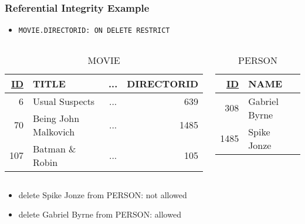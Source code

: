 \documentclass[dvipsnames]{beamer}
\theoremstyle{plain}
\begin{document}
\begin{frame}
  \frametitle{Referential Integrity Example}

  \begin{itemize}
    \item \lstinline!MOVIE.DIRECTORID: ON DELETE RESTRICT!
  \end{itemize}

  \begin{columns}
    \begin{tiny}
    \begin{table}
      \caption{MOVIE}
      \begin{tabular}{|r|l|c|r|}\hline
\underline{ID} & TITLE             & ... & DIRECTORID\\[2pt]\hline\hline
          6 & Usual Suspects       & ... &        639\\\hline
         70 & Being John Malkovich & ... &       1485\\\hline
        107 & Batman \& Robin      & ... &        105\\\hline
      \end{tabular}
    \end{table}
    \end{tiny}

    \begin{tiny}
    \begin{table}
      \caption{PERSON}
      \begin{tabular}{|r|l|}\hline
\underline{ID} & NAME\\[2pt]\hline\hline
           308 & Gabriel Byrne\\\hline
          1485 & Spike Jonze  \\\hline
      \end{tabular}
    \end{table}
    \end{tiny}
  \end{columns}

  \begin{itemize}
    \item delete Spike Jonze from PERSON: not allowed
    \pause
    \item delete Gabriel Byrne from PERSON: allowed
  \end{itemize}
\end{frame}
\end{document}
